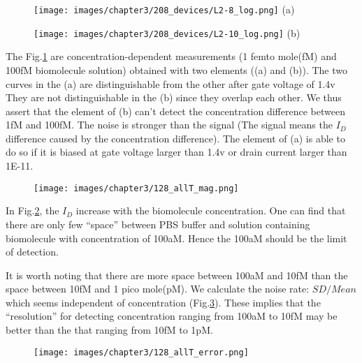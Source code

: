 \begin{figure}[!htbp]
    \centering
    \begin{minipage}[t]{0.4\textwidth}
        \centering
        \texttt{[image: images/chapter3/208\_devices/L2-8\_log.png]}
        (a)
    \end{minipage}
    \hfill
    \begin{minipage}[t]{0.4\textwidth}
        \centering
        \texttt{[image: images/chapter3/208\_devices/L2-10\_log.png]}
        (b)
    \end{minipage}
    \caption{}
    \label{fig:SD_sucandfail}
\end{figure}

The Fig.\ref{fig:SD_sucandfail} are concentration-dependent measurements (1 femto mole(fM) and 100fM biomolecule solution) obtained with two elements ((a) and (b)).
The two curves in the (a) are distinguishable from the other after gate voltage of 1.4v
They are not distinguishable in the (b) since they overlap each other.
We thus assert that the element of (b) can't detect the concentration difference between 1fM and 100fM.
The noise is stronger than the signal (The signal means the $I_D$ difference caused by the concentration difference).
The element of (a) is able to do so if it is biased at gate voltage larger than 1.4v or drain current larger than 1E-11.

\begin{figure}[!htbp]
        \texttt{[image: images/chapter3/128\_allT\_mag.png]}
    \caption{}
    \label{fig:SD_allT}
\end{figure}

In Fig.\ref{fig:SD_allT}, the $I_D$ increase with the biomolecule concentration.
One can find that there are only few ``space'' between PBS buffer and solution containing biomolecule with concentration of 100aM.
Hence the 100aM should be the limit of detection.

It is worth noting that there are more space between 100aM and 10fM than the space between 10fM and 1 pico mole(pM).
We calculate the noise rate: ${SD} / {Mean}$ which seems independent of concentration (Fig.\ref{fig:SD_allT2}).
{\color{red}These implies that the ``resolution'' for detecting concentration ranging from 100aM to 10fM may be better than the that ranging from 10fM to 1pM.}
\begin{figure}[!htbp]
        \texttt{[image: images/chapter3/128\_allT\_error.png]}
    \caption{}
    \label{fig:SD_allT2}
\end{figure}






